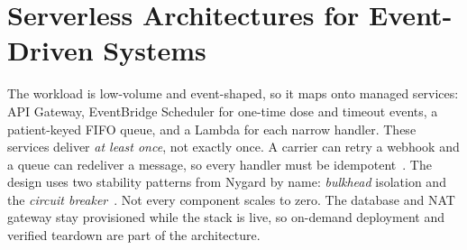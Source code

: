 \section{Serverless Architectures for Event-Driven Systems}

The workload is low-volume and event-shaped, so it maps onto managed services:
API Gateway, EventBridge Scheduler for one-time dose and timeout events, a
patient-keyed FIFO queue, and a Lambda for each narrow handler. These services
deliver \emph{at least once}, not exactly once. A carrier can retry a webhook
and a queue can redeliver a message, so every handler must be
idempotent~\cite{helland2012idempotence}. The design uses two stability
patterns from Nygard by name: \emph{bulkhead} isolation and the \emph{circuit
breaker}~\cite{nygard2018releaseit}. Not every component scales to zero. The
database and NAT gateway stay provisioned while the stack is live, so on-demand
deployment and verified teardown are part of the architecture.
